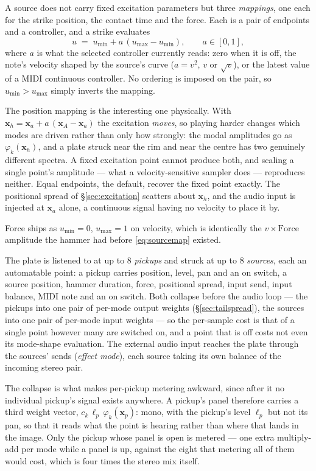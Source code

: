 \documentclass[11pt,a4paper]{article}
\begin{document}
A source does not carry fixed excitation parameters but three
\emph{mappings}, one each for the strike position, the contact time and the
force. Each is a pair of endpoints and a controller, and a strike evaluates
%
\begin{equation}
  u \;=\; u_{\min} + a\,(u_{\max} - u_{\min}),
  \qquad a \in [0,1],
  \label{eq:sourcemap}
\end{equation}
%
where $a$ is what the selected controller currently reads: zero when it is
off, the note's velocity shaped by the source's curve
($a = v^2$, $v$ or $\sqrt{v}$), or the latest value of a MIDI continuous
controller. No ordering is imposed on the pair, so $u_{\min} > u_{\max}$
simply inverts the mapping.

The position mapping is the interesting one physically. With
$\bm{x}_h = \bm{x}_a + a\,(\bm{x}_A - \bm{x}_a)$ the excitation
\emph{moves}, so playing harder changes which modes are driven rather than
only how strongly: the modal amplitudes go as $\varphi_k(\bm{x}_h)$, and a
plate struck near the rim and near the centre has two genuinely different
spectra. A fixed excitation point cannot produce both, and scaling a single
point's amplitude --- what a velocity-sensitive sampler does --- reproduces
neither. Equal endpoints, the default, recover the fixed point exactly. The
positional spread of \S\ref{sec:excitation} scatters about
$\bm{x}_h$, and the audio input is injected at $\bm{x}_a$ alone, a
continuous signal having no velocity to place it by.

Force ships as $u_{\min} = 0$, $u_{\max} = 1$ on velocity, which is
identically the $v \times \mathrm{Force}$ amplitude the hammer had before
\eqref{eq:sourcemap} existed.

The plate is listened to at up to 8 \emph{pickups} and struck at up to 8
\emph{sources}, each an automatable point: a pickup carries position,
level, pan and an on switch, a source position, hammer duration, force,
positional spread, input send, input balance, MIDI note and an on switch.
Both collapse before the audio loop --- the pickups into one pair of
per-mode output weights (\S\ref{sec:tailspread}), the sources into one
pair of per-mode input weights --- so the per-sample cost is that of a
single point however many are switched on, and a point that is off costs
not even its mode-shape evaluation. The external audio input reaches the
plate through the sources' sends (\emph{effect mode}), each source taking
its own balance of the incoming stereo pair.

The collapse is what makes per-pickup metering awkward, since after it no
individual pickup's signal exists anywhere. A pickup's panel therefore
carries a third weight vector, $c_k\,\ell_p\,\varphi_k(\bm{x}_p)$: mono,
with the pickup's level $\ell_p$ but not its pan, so that it reads what the
point is hearing rather than where that lands in the image. Only the pickup
whose panel is open is metered --- one extra multiply-add per mode while a
panel is up, against the eight that metering all of them would cost, which
is four times the stereo mix itself.
\end{document}
